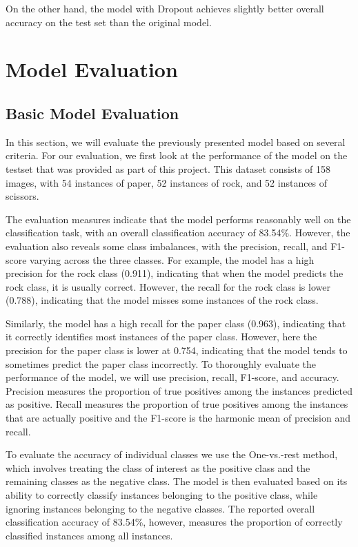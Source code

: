 \documentclass[a4paper]{article}
\begin{document}
On the other hand, the model with Dropout achieves slightly better overall accuracy on the test set than the original model.

\section{Model Evaluation}
\subsection{Basic Model Evaluation} \label{sec:basicEval}
In this section, we will evaluate the previously presented model based on several criteria. For our evaluation, we first look at the performance of the model on the testset that was provided as part of this project. This dataset consists of 158 images, with 54 instances of paper, 52 instances of rock, and 52 instances of scissors.

The evaluation measures indicate that the model performs reasonably well on the classification task, with an overall classification accuracy of 83.54\%. However, the evaluation also reveals some class imbalances, with the precision, recall, and F1-score varying across the three classes. 
For example, the model has a high precision for the rock class (0.911), indicating that when the model predicts the rock class, it is usually correct. However, the recall for the rock class is lower (0.788), indicating that the model misses some instances of the rock class.

Similarly, the model has a high recall for the paper class (0.963), indicating that it correctly identifies most instances of the paper class. However, here the precision for the paper class is lower at 0.754, indicating that the model tends to sometimes predict the paper class incorrectly.
To thoroughly evaluate the performance of the model, we will use precision, recall, F1-score, and accuracy. Precision measures the proportion of true positives among the instances predicted as positive. Recall measures the proportion of true positives among the instances that are actually positive and the F1-score is the harmonic mean of precision and recall. 

To evaluate the accuracy of individual classes we use the One-vs.-rest method, which involves treating the class of interest as the positive class and the remaining classes as the negative class. The model is then evaluated based on its ability to correctly classify instances belonging to the positive class, while ignoring instances belonging to the negative classes. The reported overall classification accuracy of 83.54\%, however, measures the proportion of correctly classified instances among all instances.
\end{document}
